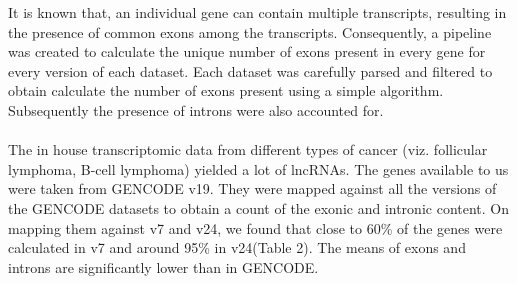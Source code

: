 \documentclass[ncrna,article,submit,moreauthors,pdftex,10pt,a4paper]{mdpi}
\begin{document}
It is known that, an individual gene can contain multiple transcripts, resulting in the presence of common exons among the transcripts.
 Consequently, a pipeline was created to calculate the unique number of exons present in every gene for every version of each dataset. 
 Each dataset was carefully parsed and filtered to obtain calculate the number of exons present using a simple algorithm. Subsequently
 the presence of introns were also accounted for.
 
 \paragraph{}
 The in house transcriptomic data from different types of cancer (viz. follicular lymphoma, B-cell lymphoma) yielded a lot of lncRNAs. 
 The genes available to us were taken from GENCODE v19.
 They were mapped against all the versions of the GENCODE datasets to obtain a count of the exonic and intronic content. 
  On mapping them against v7 and v24, we found that close to 60\% of the genes
 were calculated in v7 and around 95\% in v24(Table 2). The means of exons and introns are significantly lower than in GENCODE. 

\end{document}

